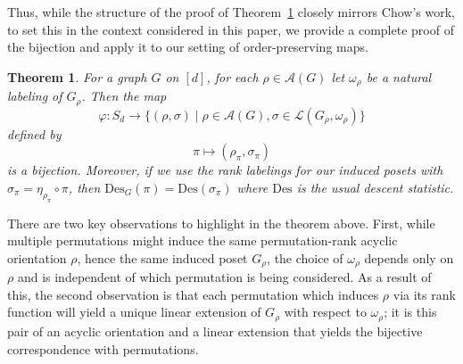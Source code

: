 \documentclass[11pt]{amsart}
\newtheorem{theorem}{Theorem}  [section] \numberwithin{equation}{section}
\newcommand{\des}{\mathrm{Des}}
\newcommand{\acyclic}[1]{\mathcal{A}(#1)}
\begin{document}
Thus, while the structure of the proof of Theorem~\ref{thm:bijectiongstats} closely mirrors Chow's work, to set
this in the context considered in this paper, we provide a complete proof of the bijection and apply it to our setting of order-preserving maps.

\begin{theorem}\label{thm:bijectiongstats}
    For a graph $G$ on $[d]$, for each $\rho \in \acyclic{G}$ let $\omega_\rho$ be  a natural labeling of
$G_\rho$. Then the map
    \[
        \varphi: S_d \to\{(\rho,\sigma) \mid \rho \in \mathcal{A}(G), \sigma \in \mathcal{L}(G_\rho,\omega_\rho) \}
    \]
    defined by
    \[
    \pi \mapsto (\rho_\pi, \sigma_\pi)
    \]
is a bijection.
    Moreover, if we use the rank labelings for our induced posets with $\sigma_\pi = \eta_{\rho_\pi} \circ \pi$, then $\des_G(\pi) = \des(\sigma_\pi)$ where $\des$ is the usual descent statistic.
\end{theorem}

There are two key observations to highlight in the theorem above.
First, while multiple permutations might induce the same permutation-rank acyclic orientation $\rho$, hence the same induced poset $G_\rho$, the choice of $\omega_\rho$ depends only on $\rho$ and is independent of which permutation is being considered.
As a result of this, the second observation is that each permutation which induces $\rho$ via its rank function will yield a unique linear extension of $G_\rho$ with respect to $\omega_\rho$; it is this pair of an acyclic orientation and a linear extension that yields the bijective correspondence with permutations.
\end{document}
